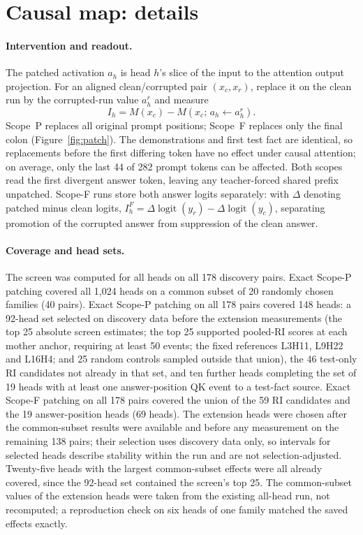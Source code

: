 \section{Causal map: details}
\label{app:stage2}

\paragraph{Intervention and readout.}
The patched activation $a_h$ is head $h$'s slice of the input to the attention
output projection. For an aligned clean/corrupted pair $(x_c,x_r)$, replace it on
the clean run by the corrupted-run value $a_h^r$ and measure
\begin{equation}
\label{eq:importance}
I_h=M(x_c)-M\!\left(x_c;\,a_h\leftarrow a_h^r\right).
\end{equation}
Scope~P replaces all original prompt positions; Scope~F replaces only the final
colon (Figure~\ref{fig:patch}). The demonstrations and first test fact are
identical, so replacements before the first differing token have no effect under
causal attention; on average, only the last 44 of 282 prompt tokens can be affected.
Both scopes read the first divergent answer token, leaving any teacher-forced
shared prefix unpatched. Scope-F runs store both answer logits separately:
with $\Delta$ denoting patched minus clean logits,
$I_h^F=\Delta\operatorname{logit}(y_r)-\Delta\operatorname{logit}(y_c)$,
separating promotion of the corrupted answer from suppression of the clean answer.

\paragraph{Coverage and head sets.}
The screen was computed for all heads on all 178 discovery pairs. Exact Scope-P
patching covered all 1,024 heads on a common subset of 20 randomly chosen families
(40 pairs). Exact Scope-P patching on all 178 pairs covered 148 heads: a 92-head set
selected on discovery data before the extension measurements (the top 25 absolute
screen estimates; the top 25 supported pooled-RI scores at each mother anchor,
requiring at least 50 events; the fixed references L3H11, L9H22 and L16H4;
and 25 random controls sampled outside that union), the 46 test-only RI candidates
not already in that set, and
ten further heads completing the set of 19 heads with at least one answer-position
QK event to a test-fact source. Exact Scope-F patching on all 178 pairs covered the
union of the 59 RI candidates and the 19 answer-position heads (69 heads). The
extension heads were chosen after the common-subset results were available and
before any measurement on the remaining 138 pairs; their selection uses discovery
data only, so intervals for selected heads describe stability within the run and
are not selection-adjusted. Twenty-five heads with the largest common-subset effects
were all already covered, since the 92-head set contained the screen's top 25. The
common-subset values of the extension heads were taken from the existing all-head
run, not recomputed; a reproduction check on six heads of one family matched the
saved effects exactly.

